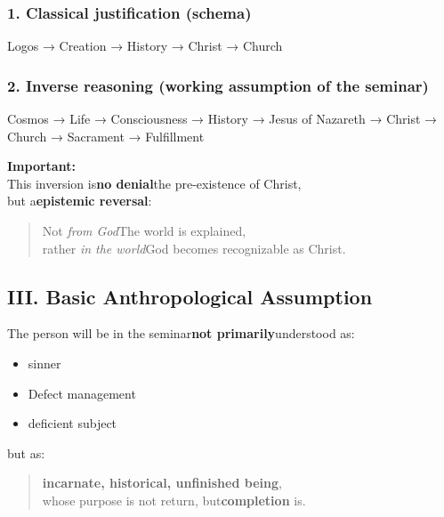 \documentclass[
]{article}
\begin{document}
\subsubsection{\texorpdfstring{\textbf{1. Classical justification (schema)}}{1. Classical justification (schema)}}\label{classical-justification-schema}

Logos → Creation → History → Christ → Church

\subsubsection{\texorpdfstring{\textbf{2. Inverse reasoning (working assumption of the seminar)}}{2. Inverse reasoning (working assumption of the seminar)}}\label{inverse-reasoning-working-assumption-of-the-seminar}

Cosmos → Life → Consciousness → History → Jesus of Nazareth → Christ → Church → Sacrament → Fulfillment

\textbf{Important:\\
}This inversion is\textbf{no denial}the pre-existence of Christ,\\
but a\textbf{epistemic reversal}:

\begin{quote}
Not \emph{from God}The world is explained,\\
rather \emph{in the world}God becomes recognizable as Christ.
\end{quote}

\subsection{\texorpdfstring{\textbf{III. Basic Anthropological Assumption}}{III. Basic Anthropological Assumption}}\label{iii.-basic-anthropological-assumption}

The person will be in the seminar\textbf{not primarily}understood as:

\begin{itemize}
\item
  sinner
\item
  Defect management
\item
  deficient subject
\end{itemize}

but as:

\begin{quote}
\textbf{incarnate, historical, unfinished being},\\
whose purpose is not return, but\textbf{completion} is.
\end{quote}
\end{document}
